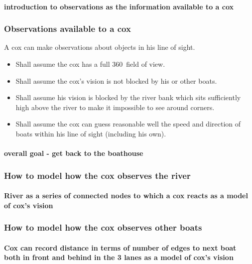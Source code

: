       \paragraph{introduction to observations as the information available to a cox}
      
      \subsubsection{Observations available to a cox}
      
      
      A cox can make observations about objects in his line of sight.
      \begin{itemize}
        \item Shall assume the cox has a full 360\textdegree\ field of
          view.
        \item Shall assume the cox's vision is not blocked by his or other boats.
        \item Shall assume his
        vision is blocked by the river bank which sits sufficiently high
        above the river to make it impossible to see around corners.
        \item Shall assume the cox can guess reasonable well the speed and
        direction of boats within his line of sight (including his own).
      \end{itemize}
        \paragraph{overall goal - get back to the boathouse}
      \subsubsection{How to model how the cox observes the river}
        \paragraph{River as a series of connected nodes to which a cox reacts as a model of cox's vision}
      \subsubsection{How to model how the cox observes other boats}
        \paragraph{Cox can record distance in terms of number of edges to next boat both in front and behind in the 3 lanes as a model of cox's vision}
        
